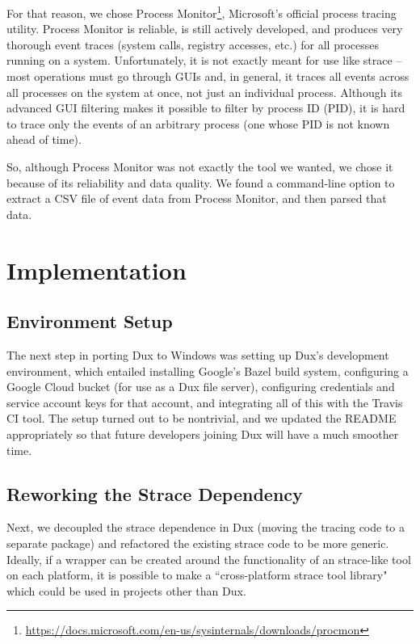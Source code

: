 \documentclass[10pt,conference]{IEEEtran}
\begin{document}
For that reason, we chose Process 
Monitor\footnote{\url{https://docs.microsoft.com/en-us/sysinternals/downloads/procmon}},
Microsoft's official process tracing utility. Process Monitor is reliable, is
still actively developed, and produces very thorough event traces (system calls, 
registry accesses, etc.) for all processes running on a system. Unfortunately, it is not
exactly meant for use like strace -- most operations must go through GUIs and,
in general, it traces all events across all processes on the system at once, not just 
an individual process. Although its advanced GUI filtering makes it possible to
filter by process ID (PID), it is hard to trace only the events of an arbitrary process (one whose
PID is not known ahead of time).

So, although Process Monitor was not exactly the tool we wanted, we chose it
because of its reliability and data quality. We found a command-line option to
extract a CSV file of event data from Process Monitor, and then parsed that data.

\section{Implementation}

\subsection{Environment Setup}

The next step in porting Dux to Windows was setting up Dux's development environment,
which entailed installing Google's Bazel build system, configuring a Google Cloud 
bucket (for use as a Dux file server), configuring credentials and service account
keys for that account, and integrating all of this with the Travis CI tool. The setup
turned out to be nontrivial, and we updated the README appropriately so
that future developers joining Dux will have a much smoother time.

\subsection{Reworking the Strace Dependency}

Next, we decoupled the strace dependence in Dux (moving the tracing code to a
separate package) and refactored the existing strace code to be more generic. 
Ideally, if a wrapper can be created around the functionality of an strace-like tool
on each platform, it is possible to make a ``cross-platform strace tool library"
which could be used in projects other than Dux.
\end{document}
